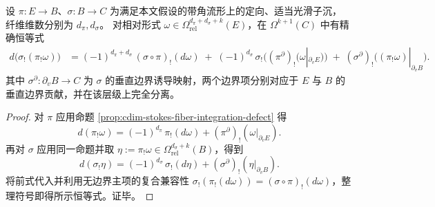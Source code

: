 \begin{theorem}\label{thm:cdim-stokes-composite-fiber-integration-defect}
设 \(\pi:E\to B\)、\(\sigma:B\to C\) 为满足本文假设的带角流形上的定向、适当光滑子沉，
纤维维数分别为 \(d_\pi,d_\sigma\)。
对相对形式 \(\omega\in\Omega^{d_\pi+d_\sigma+k}_{\mathrm{rel}}(E)\)，在 \(\Omega^{k+1}(C)\) 中有精确恒等式
\[
\boxed{
\begin{aligned}
d\big(\sigma_!(\pi_!\omega)\big)
&=(-1)^{d_\pi+d_\sigma}\,(\sigma\circ\pi)_!(d\omega)
\;+\;(-1)^{d_\sigma}\,\sigma_!\big((\pi^{\partial})_!(\omega|_{\partial_vE})\big)
\;+\;(\sigma^{\partial})_!\big((\pi_!\omega)|_{\partial_vB}\big).
\end{aligned}}
\]
其中 \(\sigma^{\partial}:\partial_vB\to C\) 为 \(\sigma\) 的垂直边界诱导映射，两个边界项分别对应于 \(E\) 与 \(B\) 的垂直边界贡献，并在该层级上完全分离。
\end{theorem}
\begin{proof}
对 \(\pi\) 应用命题 \ref{prop:cdim-stokes-fiber-integration-defect} 得
\[
d(\pi_!\omega)=(-1)^{d_\pi}\,\pi_!(d\omega)+(\pi^{\partial})_!(\omega|_{\partial_vE}).
\]
再对 \(\sigma\) 应用同一命题并取 \(\eta:=\pi_!\omega\in\Omega^{d_\sigma+k}_{\mathrm{rel}}(B)\)，得到
\[
d(\sigma_!\eta)=(-1)^{d_\sigma}\,\sigma_!(d\eta)+(\sigma^{\partial})_!(\eta|_{\partial_vB}).
\]
将前式代入并利用无边界主项的复合兼容性 \(\sigma_!(\pi_!(d\omega))=(\sigma\circ\pi)_!(d\omega)\)，整理符号即得所示恒等式。证毕。
\end{proof}

\endinput
